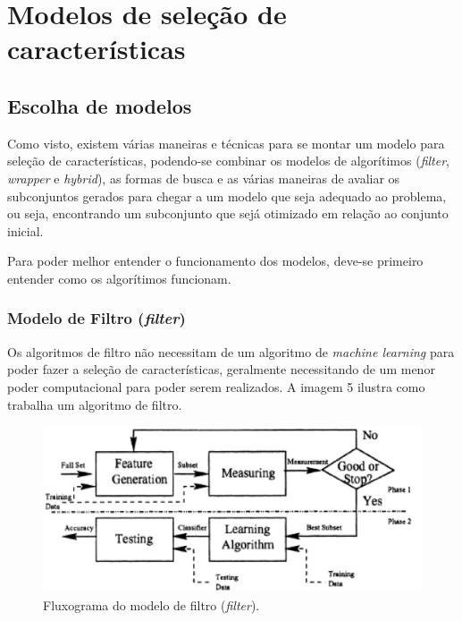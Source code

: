 \chapter[Modelos de seleção de características]{Modelos de seleção de características}

\section{Escolha de modelos}

Como visto, existem várias maneiras e técnicas para se montar um modelo para seleção de características, podendo-se combinar os modelos de algorítimos (\textit{filter}, \textit{wrapper} e \textit{hybrid}), as formas de busca e as várias maneiras de avaliar os subconjuntos gerados para chegar a um modelo que seja adequado ao problema, ou seja, encontrando um subconjunto que sejá otimizado em relação ao conjunto inicial.

Para poder melhor entender o funcionamento dos modelos, deve-se primeiro entender como os algorítimos funcionam.

\subsection{Modelo de Filtro (\textit{filter})}

Os algoritmos de filtro não necessitam de um algoritmo de \textit{machine learning} para poder fazer a seleção de características, geralmente necessitando de um menor poder computacional para poder serem realizados. A imagem 5 ilustra como trabalha um algoritmo de filtro.

\begin{figure}[h]
	\centering
	\label{fig05}
		\includegraphics[keepaspectratio=true,scale=1]{figuras/fig05.eps}
	\caption{Fluxograma do modelo de filtro (\textit{filter}). \cite{huan_1998}}
\end{figure}

